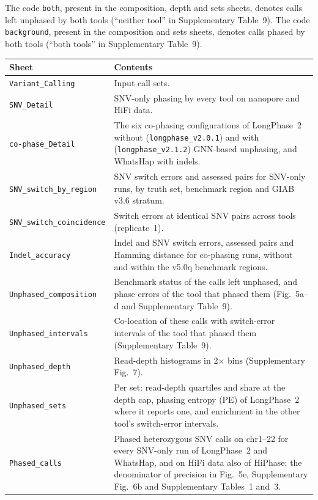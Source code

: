 \documentclass[11pt,a4paper]{article}
\newcommand{\toolname}{LongPhase~2\xspace}
\newcommand{\whatshap}{WhatsHap\xspace}
\newcommand{\code}[1]{\texttt{\small #1}}
\begin{document}
The code \code{both}, present in the composition, depth and sets sheets, denotes calls left unphased by both tools (``neither tool'' in Supplementary Table~9). The code \code{background}, present in the composition and sets sheets, denotes calls phased by both tools (``both tools'' in Supplementary Table~9).

\medskip
{\small
\noindent\begin{tabular}{@{}L{4.8cm}L{10.9cm}@{}}
\toprule
\textbf{Sheet} & \textbf{Contents} \\
\midrule
\code{Variant\_Calling} & Input call sets. \\[4pt]
\code{SNV\_Detail} & SNV-only phasing by every tool on nanopore and HiFi data. \\[4pt]
\code{co-phase\_Detail} & The six co-phasing configurations of \toolname without (\code{longphase\_v2.0.1}) and with (\code{longphase\_v2.1.2}) GNN-based unphasing, and \whatshap with indels. \\[4pt]
\code{SNV\_switch\_by\_region} & SNV switch errors and assessed pairs for SNV-only runs, by truth set, benchmark region and GIAB v3.6 stratum. \\[4pt]
\code{SNV\_switch\_coincidence} & Switch errors at identical SNV pairs across tools (replicate~1). \\[4pt]
\code{Indel\_accuracy} & Indel and SNV switch errors, assessed pairs and Hamming distance for co-phasing runs, without and within the v5.0q benchmark regions. \\[4pt]
\code{Unphased\_composition} & Benchmark status of the calls left unphased, and phase errors of the tool that phased them (Fig.~5a--d and Supplementary Table~9). \\[4pt]
\code{Unphased\_intervals} & Co-location of these calls with switch-error intervals of the tool that phased them (Supplementary Table~9). \\[4pt]
\code{Unphased\_depth} & Read-depth histograms in 2$\times$ bins (Supplementary Fig.~7). \\[4pt]
\code{Unphased\_sets} & Per set: read-depth quartiles and share at the depth cap, phasing entropy (PE) of \toolname where it reports one, and enrichment in the other tool's switch-error intervals. \\[4pt]
\code{Phased\_calls} & Phased heterozygous SNV calls on chr1--22 for every SNV-only run of \toolname and \whatshap, and on HiFi data also of HiPhase; the denominator of precision in Fig.~5e, Supplementary Fig.~6b and Supplementary Tables~1 and~3. \\[4pt]

\end{tabular}}
\end{document}
